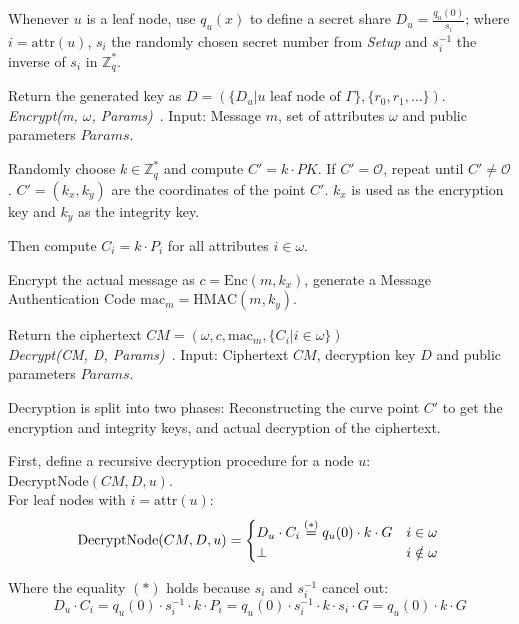 Whenever $u$ is a leaf node, use $q_u(x)$ to define a secret share $D_u = \frac{q_u(0)}{s_i}$; where $i = \text{attr}(u)$, $s_i$ the randomly chosen secret number from \emph{Setup} and $s_i^{-1}$ the inverse of $s_i$ in $\mathbb{Z}_q^*$.

Return the generated key as $D = (\{D_u | u \text{ leaf node of } \Gamma\}, \{r_0, r_1, \dots \})$.\\

\emph{Encrypt(m, $\omega$, Params)}~\cite{yao_lightweight_2015}.
Input: Message $m$, set of attributes $\omega$ and public parameters $Params$.

Randomly choose $k \in \mathbb{Z}_q^*$ and compute $C' = k \cdot PK$. If $C' = \mathcal{O}$, repeat until $C' \neq \mathcal{O}$.
$C' = (k_x, k_y)$ are the coordinates of the point $C'$. $k_x$ is used as the encryption key and $k_y$ as the integrity key.

Then compute $C_i = k \cdot P_i$ for all attributes $i \in \omega$.

Encrypt the actual message as $c = \text{Enc}(m, k_x)$, generate a Message Authentication Code $\text{mac}_m = \text{HMAC}(m, k_y)$.

Return the ciphertext $CM = (\omega, c, \text{mac}_m, \{C_i | i \in \omega\})$\\

\emph{Decrypt(CM, D, Params)}~\cite{yao_lightweight_2015}. Input: Ciphertext $CM$, decryption key $D$ and public parameters $Params$.

Decryption is split into two phases: Reconstructing the curve point $C'$ to get the encryption and integrity keys, and actual decryption of the ciphertext.

First, define a recursive decryption procedure for a node $u$: $\text{DecryptNode}(CM, D, u)$. \\ %
For leaf nodes with $i = \text{attr}(u)$:
\begin{equation*}
    \text{DecryptNode}(CM, D, u) = \begin{cases}
        D_u \cdot C_i \stackrel{(*)}{=} q_u(0) \cdot k \cdot G & i \in \omega\\
        \perp & i \notin \omega
    \end{cases}\\
\end{equation*}

Where the equality $(*)$ holds because $s_i$ and $s_i^{-1}$ cancel out: 
\begin{equation*}
    D_u \cdot C_i = q_u(0) \cdot s_i^{-1} \cdot k \cdot P_i = q_u(0) \cdot s_i^{-1} \cdot k \cdot s_i \cdot G = q_u(0) \cdot k \cdot G
\end{equation*}

